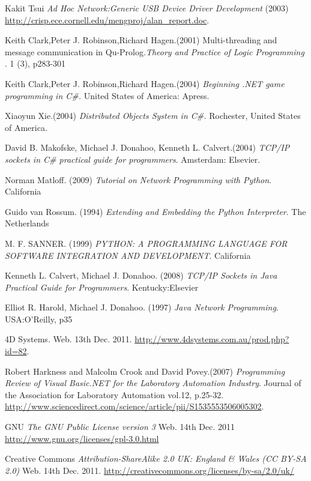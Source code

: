 \begin{thebibliography}{9}
	 Kakit Tsui \emph{Ad Hoc Network:Generic USB Device Driver Development} (2003)
\url{http://crisp.ece.cornell.edu/mengproj/alan_report.doc}.

	 Keith Clark,Peter J. Robinson,Richard Hagen.(2001) Multi-threading and message communication in Qu-Prolog.\textit{Theory and Practice of Logic Programming} . 1 (3), p283-301 
	
	 Keith Clark,Peter J. Robinson,Richard Hagen.(2004) \textit{Beginning .NET game programming in C\#.} United States of America: Apress. 

	 Xiaoyun Xie.(2004) \textit{Distributed Objects System in C\#.} Rochester, United States of America. 

	 David B. Makofske, Michael J. Donahoo, Kenneth L. Calvert.(2004) \textit{TCP/IP sockets in C\#  practical guide for programmers}. Amsterdam: Elsevier.

	 Norman Matloff. (2009) \textit{Tutorial on Network Programming with Python}. California

	 Guido van Rossum. (1994) \textit{Extending and Embedding the Python Interpreter}. The Netherlands

	 M. F. SANNER. (1999) \textit{PYTHON: A PROGRAMMING LANGUAGE FOR SOFTWARE
INTEGRATION AND DEVELOPMENT}. California

	 Kenneth L. Calvert, Michael J. Donahoo. (2008) \textit{TCP/IP Sockets in Java
Practical Guide for Programmers}. Kentucky:Elsevier

	 Elliot R. Harold, Michael J. Donahoo. (1997) \textit{Java Network Programming}. USA:O'Reilly, p35

	 4D Systems. Web. 13th Dec. 2011. \url{http://www.4dsystems.com.au/prod.php?id=82}.

	Robert Harkness and Malcolm Crook and David Povey.(2007) \textit{Programming Review of Visual Basic.NET for the Laboratory Automation Industry}. Journal of the Association for Laboratory Automation vol.12, p.25-32.
	\url{http://www.sciencedirect.com/science/article/pii/S1535553506005302}.

	 GNU \emph{The GNU Public License version 3} Web. 14th Dec. 2011 \url{http://www.gnu.org/licenses/gpl-3.0.html}

	 Creative Commons \emph{Attribution-ShareAlike 2.0 UK: England \& Wales (CC BY-SA 2.0)} Web. 14th Dec. 2011. \url{http://creativecommons.org/licenses/by-sa/2.0/uk/}
	

\end{thebibliography}
